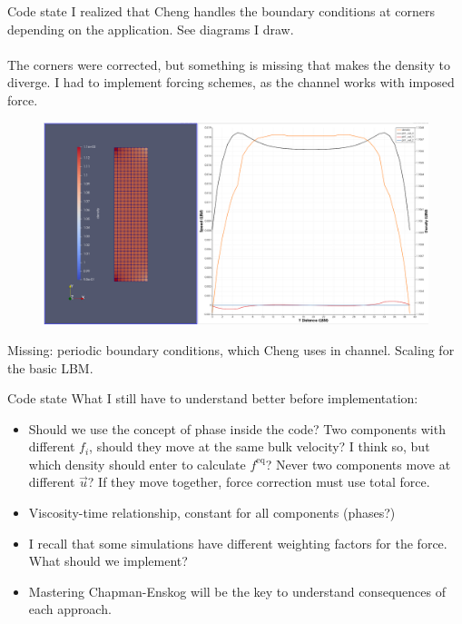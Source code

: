 \documentclass{beamer}
\begin{document}
	\begin{frame}{Code state}
		I realized that Cheng handles the boundary conditions at corners depending on the application. See diagrams I draw.\\~\\
		The corners were corrected, but something is missing that makes the density to diverge. I had to implement forcing schemes, as the channel works with imposed force.
		\begin{figure}
			\includegraphics[scale=0.1]{pics/firstRunChannel.png}
		\end{figure}
		Missing: periodic boundary conditions, which Cheng uses in channel. Scaling for the basic LBM. 
	\end{frame}

	\begin{frame}{Code state}
		What I still have to understand better before implementation:
		\begin{itemize}
			\item Should we use the concept of phase inside the code? Two components with different $f_i$, should they move at the same bulk velocity? I think so, but which density should enter to calculate $f^{\text{eq}}$? Never two components move at different $\vec{u}$? If they move together, force correction must use total force. 
			\item Viscosity-time relationship, constant for all components (phases?) 
			\item I recall that some simulations have different weighting factors for the force. What should we implement?
			\item Mastering Chapman-Enskog will be the key to understand consequences of each approach.
		\end{itemize}
	\end{frame}
	
\end{document}
